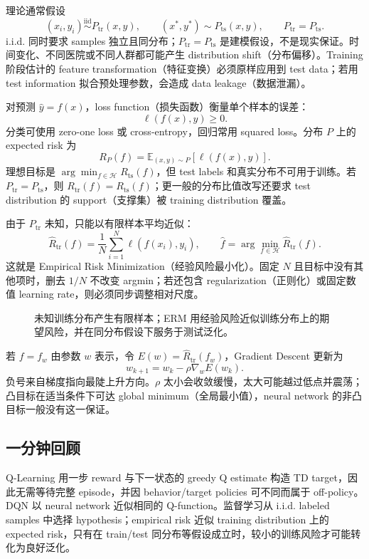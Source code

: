 理论通常假设
\[
  (x_i,y_i)\overset{\mathrm{iid}}{\sim}P_{\mathrm{tr}}(x,y),
  \qquad
  (x^*,y^*)\sim P_{\mathrm{ts}}(x,y),
  \qquad
  \boxed{P_{\mathrm{tr}}=P_{\mathrm{ts}}}.
\]
i.i.d. 同时要求 samples 独立且同分布；$P_{\mathrm{tr}}=P_{\mathrm{ts}}$ 是建模假设，不是现实保证。时间变化、不同医院或不同人群都可能产生 distribution shift（分布偏移）。Training 阶段估计的 feature transformation（特征变换）必须原样应用到 test data；若用 test information 拟合预处理参数，会造成 data leakage（数据泄漏）。


对预测 $\widehat y=f(x)$，loss function（损失函数）衡量单个样本的误差：
\[
  \ell(f(x),y)\ge 0.
\]
分类可使用 zero-one loss 或 cross-entropy，回归常用 squared loss。分布 $P$ 上的 expected risk 为
\[
  R_P(f)=\mathbb E_{(x,y)\sim P}\!\left[\ell(f(x),y)\right].
\]
理想目标是 $\arg\min_{f\in\mathcal H}R_{\mathrm{ts}}(f)$，但 test labels 和真实分布不可用于训练。若 $P_{\mathrm{tr}}=P_{\mathrm{ts}}$，则 $R_{\mathrm{tr}}(f)=R_{\mathrm{ts}}(f)$；更一般的分布比值改写还要求 test distribution 的 support（支撑集）被 training distribution 覆盖。

由于 $P_{\mathrm{tr}}$ 未知，只能以有限样本平均近似：
\[
  \widehat R_{\mathrm{tr}}(f)
  =\frac1N\sum_{i=1}^{N}\ell(f(x_i),y_i),
  \qquad
  \widehat f=\arg\min_{f\in\mathcal H}\widehat R_{\mathrm{tr}}(f).
\]
这就是 Empirical Risk Minimization（经验风险最小化）。固定 $N$ 且目标中没有其他项时，删去 $1/N$ 不改变 argmin；若还包含 regularization（正则化）或固定数值 learning rate，则必须同步调整相对尺度。

\begin{figure}[htbp]
  \centering
  \resizebox{0.92\textwidth}{!}{}
  \caption{未知训练分布产生有限样本；ERM 用经验风险近似训练分布上的期望风险，并在同分布假设下服务于测试泛化。}
  \label{fig:sc3000-l05-supervised-risk}
\end{figure}

若 $f=f_w$ 由参数 $w$ 表示，令 $E(w)=\widehat R_{\mathrm{tr}}(f_w)$，Gradient Descent 更新为
\[
  \boxed{w_{k+1}=w_k-\rho\nabla_w E(w_k)}.
\]
负号来自梯度指向最陡上升方向。$\rho$ 太小会收敛缓慢，太大可能越过低点并震荡；凸目标在适当条件下可达 global minimum（全局最小值），neural network 的非凸目标一般没有这一保证。

\subsection{一分钟回顾}

Q-Learning 用一步 reward 与下一状态的 greedy Q estimate 构造 TD target，因此无需等待完整 episode，并因 behavior/target policies 可不同而属于 off-policy。DQN 以 neural network 近似相同的 Q-function。监督学习从 i.i.d. labeled samples 中选择 hypothesis；empirical risk 近似 training distribution 上的 expected risk，只有在 train/test 同分布等假设成立时，较小的训练风险才可能转化为良好泛化。
